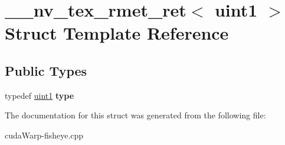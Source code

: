\hypertarget{struct____nv__tex__rmet__ret_3_01uint1_01_4}{}\section{\+\_\+\+\_\+nv\+\_\+tex\+\_\+rmet\+\_\+ret$<$ uint1 $>$ Struct Template Reference}
\label{struct____nv__tex__rmet__ret_3_01uint1_01_4}
\subsection*{Public Types}
\begin{DoxyCompactItemize}
\item 
typedef \hyperlink{structuint1}{uint1} {\bfseries type}\hypertarget{struct____nv__tex__rmet__ret_3_01uint1_01_4_a0cce385fcbbf917a8c604f0f8911ce69}{}\label{struct____nv__tex__rmet__ret_3_01uint1_01_4_a0cce385fcbbf917a8c604f0f8911ce69}

\end{DoxyCompactItemize}


The documentation for this struct was generated from the following file\+:\begin{DoxyCompactItemize}
\item 
cuda\+Warp-\/fisheye.\+cpp\end{DoxyCompactItemize}
